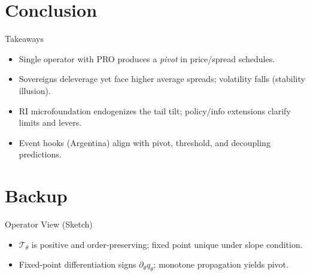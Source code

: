 \documentclass[aspectratio=169,11pt,professionalfonts]{beamer}
\newcommand{\1}{\mathbb{1}}
\begin{document}
\section{Conclusion}

\begin{frame}{Takeaways}
  \begin{itemize}
    \item Single operator with PRO produces a \emph{pivot} in price/spread schedules.
    \item Sovereigns deleverage yet face higher average spreads; volatility falls
          (stability illusion).
    \item RI microfoundation endogenizes the tail tilt; policy/info extensions clarify
          limits and levers.
    \item Event hooks (Argentina) align with pivot, threshold, and decoupling
          predictions.
  \end{itemize}
\end{frame}

\appendix
\section{Backup}

\begin{frame}{Operator View (Sketch)}
  \begin{itemize}
    \item $\mathcal T_\theta$ is positive and order-preserving; fixed point unique under slope condition.
    \item Fixed-point differentiation signs $\partial_\theta q_\theta$; monotone
          propagation yields pivot.
  \end{itemize}
\end{frame}
\end{document}
